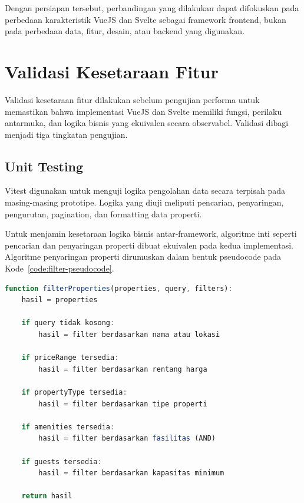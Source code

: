 \documentclass[12pt,a4paper]{report}
\begin{document}
Dengan persiapan tersebut, perbandingan yang dilakukan dapat difokuskan pada perbedaan karakteristik VueJS dan Svelte sebagai framework frontend, bukan pada perbedaan data, fitur, desain, atau backend yang digunakan.

\section{Validasi Kesetaraan Fitur}
\label{sec:validasi-kesetaraan}
Validasi kesetaraan fitur dilakukan sebelum pengujian performa untuk memastikan bahwa implementasi VueJS dan Svelte memiliki fungsi, perilaku antarmuka, dan logika bisnis yang ekuivalen secara observabel. Validasi dibagi menjadi tiga tingkatan pengujian.

\subsection{Unit Testing}
\label{sec:unit-testing}
Vitest digunakan untuk menguji logika pengolahan data secara terpisah pada masing-masing prototipe. Logika yang diuji meliputi pencarian, penyaringan, pengurutan, pagination, dan formatting data properti.

Untuk menjamin kesetaraan logika bisnis antar-framework, algoritme inti seperti pencarian dan penyaringan properti dibuat ekuivalen pada kedua implementasi. Algoritme penyaringan properti dirumuskan dalam bentuk pseudocode pada Kode~\ref{code:filter-pseudocode}.

\begin{lstlisting}[language=TypeScript, caption={Pseudocode Algoritme Penyaringan Properti Ekuivalen}, label={code:filter-pseudocode}]
function filterProperties(properties, query, filters):
    hasil = properties

    if query tidak kosong:
        hasil = filter berdasarkan nama atau lokasi

    if priceRange tersedia:
        hasil = filter berdasarkan rentang harga

    if propertyType tersedia:
        hasil = filter berdasarkan tipe properti

    if amenities tersedia:
        hasil = filter berdasarkan fasilitas (AND)

    if guests tersedia:
        hasil = filter berdasarkan kapasitas minimum

    return hasil
\end{lstlisting}
\end{document}
